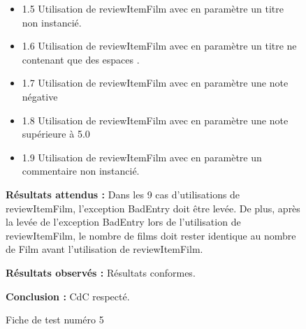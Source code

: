 \documentclass[12pt,a4paper]{report}
\begin{document}
\begin{figure}
\begin{itemize}
	\item	1.5 Utilisation de reviewItemFilm avec en paramètre un titre non instancié. 
	\item	1.6 Utilisation de reviewItemFilm avec en paramètre un titre ne contenant que des espaces . 
	\item	1.7 Utilisation de reviewItemFilm avec en paramètre une note négative 
	\item	1.8 Utilisation de reviewItemFilm avec en paramètre une note supérieure à 5.0 
	\item	1.9 Utilisation de reviewItemFilm avec en paramètre un commentaire non instancié. 
\end{itemize}

\textbf{Résultats attendus : }
Dans les 9 cas d’utilisations de reviewItemFilm, l’exception BadEntry doit être levée. 
De plus, après la levée de l’exception BadEntry lors de l’utilisation de reviewItemFilm, le nombre de films doit rester identique au nombre de Film avant l’utilisation de reviewItemFilm. 

\textbf{Résultats observés : }
Résultats conformes.

\textbf{Conclusion : }
CdC respecté.
\caption{Fiche de test numéro 5}
\end{figure}
\end{document}
